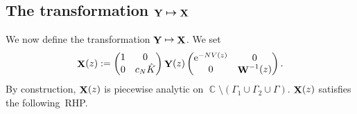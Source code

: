 \documentclass[pdftex]{sigma}
\DeclareMathOperator{\CC}{\mathbb{C}}
\DeclareMathOperator{\YY}{{\bf Y}}
\DeclareMathOperator{\XX}{{\bf X}}
\DeclareMathOperator{\WW}{{\bf W}}
\numberwithin{equation}{section}
\begin{document}
\subsection[The transformation ${\YY} \mapsto {\XX}$]{The transformation $\boldsymbol{{\YY} \mapsto {\XX}}$}
We now define the transformation $\YY \mapsto \XX$. We set
 \begin{equation*}
 \XX(z) :=
 \begin{pmatrix}
 1 & 0 \\
 0 & c_N \hat{K}
 \end{pmatrix}
 \YY(z)
 \begin{pmatrix}
 {\rm e}^{-NV(z)} & 0 \\
 0 & \WW^{-1}(z)
 \end{pmatrix}.
 \end{equation*}
By construction, $\XX(z)$ is piecewise analytic on $\CC\setminus (\Gamma_1 \cup \Gamma_2 \cup \Gamma)$. $\XX(z)$ satisfies the following~RHP.
\end{document}
